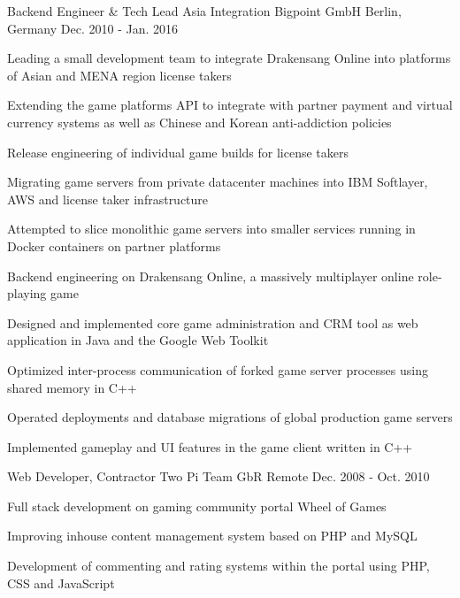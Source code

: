 \begin{cventries}
  \cventry
    {Backend Engineer \& Tech Lead Asia Integration} %
    {Bigpoint GmbH} %
    {Berlin, Germany} %
    {Dec. 2010 - Jan. 2016} %
    {
      \begin{cvitems} %
        \item {Leading a small development team to integrate Drakensang Online into platforms of Asian and MENA region license takers}
        \begin{cvsubitems}
          \item {Extending the game platforms API to integrate with partner payment and virtual currency systems as well as Chinese and Korean anti-addiction policies}
          \item {Release engineering of individual game builds for license takers}
          \item {Migrating game servers from private datacenter machines into IBM Softlayer, AWS and license taker infrastructure}
          \item {Attempted to slice monolithic game servers into smaller services running in Docker containers on partner platforms}
        \end{cvsubitems}
        \item {Backend engineering on Drakensang Online, a massively multiplayer online role-playing game}
        \begin{cvsubitems}
          \item {Designed and implemented core game administration and CRM tool as web application in Java and the Google Web Toolkit}
          \item {Optimized inter-process communication of forked game server processes using shared memory in C++}
          \item {Operated deployments and database migrations of global production game servers}
          \item {Implemented gameplay and UI features in the game client written in C++}
        \end{cvsubitems}
      \end{cvitems}
    }

  \cventry
    {Web Developer, Contractor} %
    {Two Pi Team GbR} %
    {Remote} %
    {Dec. 2008 - Oct. 2010} %
    {
      \begin{cvitems} %
        \item {Full stack development on gaming community portal Wheel of Games}
        \item {Improving inhouse content management system based on PHP and MySQL}
        \item {Development of commenting and rating systems within the portal using PHP, CSS and JavaScript}
      \end{cvitems}
    }

\end{cventries}
